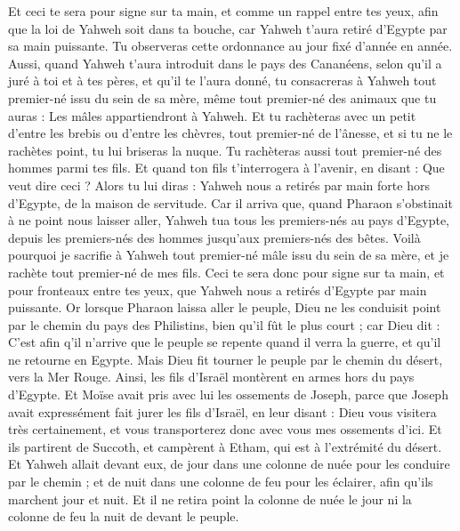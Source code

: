 \begin{multicols}{2}
Et ceci te sera pour signe sur ta main, et comme un rappel entre tes yeux, afin que la loi de Yahweh soit dans ta bouche, car Yahweh t'aura retiré d'Egypte par sa main puissante.
Tu observeras cette ordonnance au jour fixé d’année en année.
Aussi, quand Yahweh t'aura introduit dans le pays des Cananéens, selon qu'il a juré à toi et à tes pères, et qu'il te l'aura donné,
tu consacreras à Yahweh tout premier-né issu du sein de sa mère, même tout premier-né des animaux que tu auras : Les mâles appartiendront à Yahweh.
Et tu rachèteras avec un petit d'entre les brebis ou d'entre les chèvres, tout premier-né de l’ânesse, et si tu ne le rachètes point, tu lui briseras la nuque. Tu rachèteras aussi tout premier-né des hommes parmi tes fils.
Et quand ton fils t'interrogera à l'avenir, en disant : Que veut dire ceci ? Alors tu lui diras : Yahweh nous a retirés par main forte hors d'Egypte, de la maison de servitude.
Car il arriva que, quand Pharaon s’obstinait à ne point nous laisser aller, Yahweh tua tous les premiers-nés au pays d'Egypte, depuis les premiers-nés des hommes jusqu’aux premiers-nés des bêtes. Voilà pourquoi je sacrifie à Yahweh tout premier-né mâle issu du sein de sa mère, et je rachète tout premier-né de mes fils.
Ceci te sera donc pour signe sur ta main, et pour  fronteaux entre tes yeux, que Yahweh nous a retirés d'Egypte par main puissante.
Or lorsque Pharaon laissa aller le peuple, Dieu ne les conduisit point par le chemin du pays des Philistins, bien qu'il fût le plus court ; car Dieu dit : C'est afin q'il n'arrive que le peuple  se repente quand il verra la guerre, et qu'il ne retourne en Egypte.
Mais Dieu fit tourner le peuple par le chemin du désert, vers la Mer Rouge. Ainsi, les fils d'Israël montèrent en armes hors du pays d'Egypte.
Et Moïse avait pris avec lui les ossements de Joseph, parce que Joseph avait expressément fait jurer les fils d'Israël, en leur disant : Dieu vous visitera très certainement, et vous transporterez donc avec vous mes ossements d'ici.
Et ils partirent de Succoth, et campèrent à Etham, qui est à l’extrémité du désert.
Et Yahweh allait devant eux, de jour dans une colonne de nuée pour les conduire par le chemin ; et de nuit dans une colonne de feu pour les éclairer, afin qu'ils marchent jour et nuit.
Et il ne retira point la colonne de nuée le jour ni la colonne de feu la nuit de devant le peuple.

\end{multicols}
